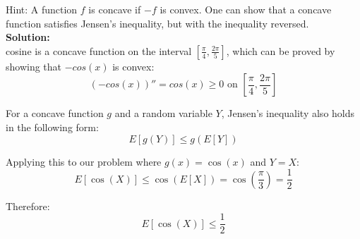 \documentclass{article}
\begin{document}
Hint: A function $f$ is concave if $-f$ is convex. One can show that a concave function satisfies Jensen's inequality, but with the inequality reversed. \\

\textbf{Solution:} \\

cosine is a concave function on the interval $[\frac{\pi}{4}, \frac{2\pi}{5}]$, which can be proved by showing that $-cos(x)$ is convex:
$$(-cos(x))'' = cos(x) \geq 0 \text{ on } [\frac{\pi}{4}, \frac{2\pi}{5}]$$

For a concave function $g$ and a random variable $Y$, Jensen's inequality also holds in the following form:
   \[
   E[g(Y)] \leq g(E[Y])
   \]

Applying this to our problem where $g(x) = \cos(x)$ and $Y = X$:
\[
    E[\cos(X)] \leq \cos(E[X]) = \cos(\frac{\pi}{3}) = \frac{1}{2}
\]

Therefore:
\[
    E[\cos(X)] \leq \frac{1}{2}
\]

\newpage
\end{document}
